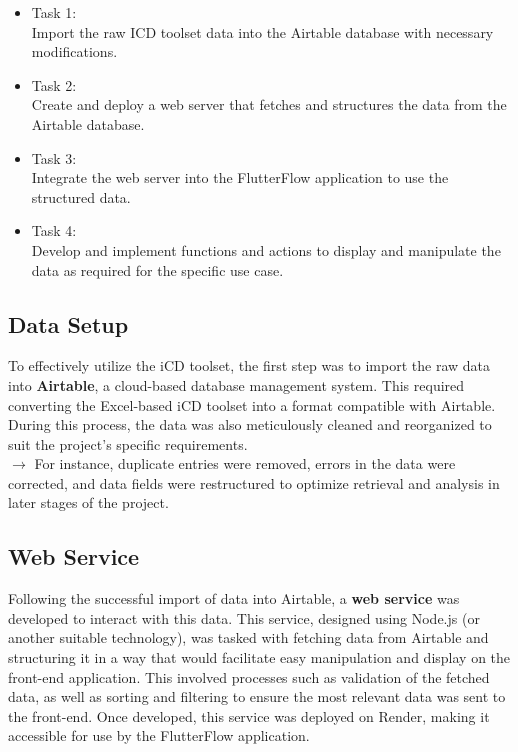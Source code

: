 \begin{itemize}
\item Task 1: \\
Import the raw ICD toolset data into the Airtable database with necessary modifications.
\item Task 2: \\
Create and deploy a web server that fetches and structures the data from the Airtable database.
\item Task 3: \\
Integrate the web server into the FlutterFlow application to use the structured data.
\item Task 4: \\
Develop and implement functions and actions to display and manipulate the data as required for the specific use case.
\end{itemize}


\subsection{Data Setup}

To effectively utilize the iCD toolset, the first step was to import the raw data into {\color{limeGreen}\textbf{Airtable}}, a cloud-based database management system. 
This required converting the Excel-based iCD toolset into a format compatible with Airtable. 
During this process, the data was also meticulously cleaned and reorganized to suit the project's specific requirements. \\
$ \rightarrow $ \quad For instance, duplicate entries were removed, errors in the data were corrected, and data fields were restructured to optimize retrieval and analysis in later stages of the project.

\subsection{Web Service}

Following the successful import of data into Airtable, a {\color{limeGreen}\textbf{web service}} was developed to interact with this data. 
This service, designed using Node.js (or another suitable technology), was tasked with fetching data from Airtable and structuring it in a way that would facilitate easy manipulation and display on the front-end application. 
This involved processes such as validation of the fetched data, as well as sorting and filtering to ensure the most relevant data was sent to the front-end. 
Once developed, this service was deployed on Render, making it accessible for use by the FlutterFlow application.


